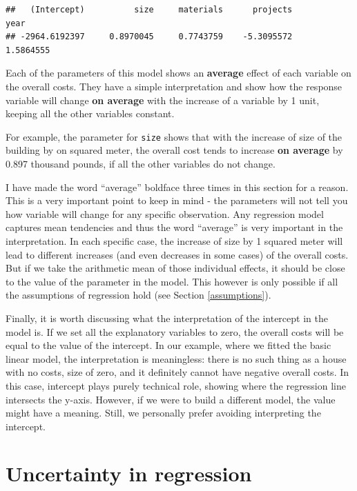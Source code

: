 \documentclass[
]{book}
\theoremstyle{definition}
\theoremstyle{definition}
\theoremstyle{definition}
\theoremstyle{definition}
\theoremstyle{remark}
\begin{document}
\begin{verbatim}
##   (Intercept)          size     materials      projects          year 
## -2964.6192397     0.8970045     0.7743759    -5.3095572     1.5864555
\end{verbatim}

Each of the parameters of this model shows an \textbf{average} effect of each variable on the overall costs. They have a simple interpretation and show how the response variable will change \textbf{on average} with the increase of a variable by 1 unit, keeping all the other variables constant.

For example, the parameter for \texttt{size} shows that with the increase of size of the building by on squared meter, the overall cost tends to increase \textbf{on average} by 0.897 thousand pounds, if all the other variables do not change.

I have made the word ``average'' boldface three times in this section for a reason. This is a very important point to keep in mind - the parameters will not tell you how variable will change for any specific observation. Any regression model captures mean tendencies and thus the word ``average'' is very important in the interpretation. In each specific case, the increase of size by 1 squared meter will lead to different increases (and even decreases in some cases) of the overall costs. But if we take the arithmetic mean of those individual effects, it should be close to the value of the parameter in the model. This however is only possible if all the assumptions of regression hold (see Section \ref{assumptions}).

Finally, it is worth discussing what the interpretation of the intercept in the model is. If we set all the explanatory variables to zero, the overall costs will be equal to the value of the intercept. In our example, where we fitted the basic linear model, the interpretation is meaningless: there is no such thing as a house with no costs, size of zero, and it definitely cannot have negative overall costs. In this case, intercept plays purely technical role, showing where the regression line intersects the y-axis. However, if we were to build a different model, the value might have a meaning. Still, we personally prefer avoiding interpreting the intercept.

\chapter{Uncertainty in regression}\label{uncertaintyParameters}
\end{document}
